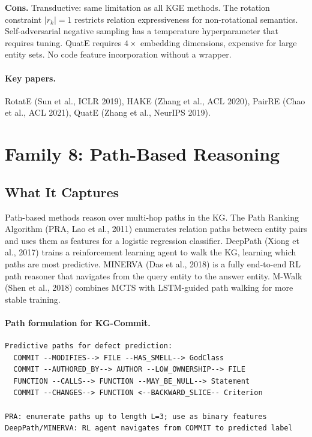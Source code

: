 \documentclass[12pt,a4paper]{article}
\begin{document}
\begin{consbox}
\textbf{Cons.}
Transductive: same limitation as all KGE methods. The rotation constraint
$|r_k|=1$ restricts relation expressiveness for non-rotational semantics.
Self-adversarial negative sampling has a temperature hyperparameter that
requires tuning. QuatE requires $4\times$ embedding dimensions, expensive
for large entity sets. No code feature incorporation without a wrapper.
\end{consbox}

\paragraph{Key papers.} RotatE (Sun et al., ICLR 2019), HAKE (Zhang et al.,
ACL 2020), PairRE (Chao et al., ACL 2021), QuatE (Zhang et al., NeurIPS 2019).

\section{Family 8: Path-Based Reasoning}

\subsection{What It Captures}

Path-based methods reason over multi-hop paths in the KG. The Path Ranking
Algorithm (PRA, Lao et al., 2011) enumerates relation paths between entity
pairs and uses them as features for a logistic regression classifier.
DeepPath (Xiong et al., 2017) trains a reinforcement learning agent to walk
the KG, learning which paths are most predictive. MINERVA (Das et al., 2018)
is a fully end-to-end RL path reasoner that navigates from the query entity
to the answer entity. M-Walk (Shen et al., 2018) combines MCTS with LSTM-guided
path walking for more stable training.

\paragraph{Path formulation for KG-Commit.}
\begin{lstlisting}
Predictive paths for defect prediction:
  COMMIT --MODIFIES--> FILE --HAS_SMELL--> GodClass
  COMMIT --AUTHORED_BY--> AUTHOR --LOW_OWNERSHIP--> FILE
  FUNCTION --CALLS--> FUNCTION --MAY_BE_NULL--> Statement
  COMMIT --CHANGES--> FUNCTION <--BACKWARD_SLICE-- Criterion

PRA: enumerate paths up to length L=3; use as binary features
DeepPath/MINERVA: RL agent navigates from COMMIT to predicted label
\end{lstlisting}
\end{document}

